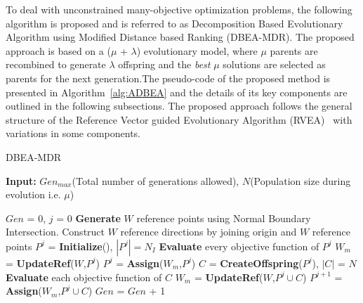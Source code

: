 \documentclass{sig-alternate}
\begin{document}
To deal with unconstrained many-objective optimization problems, the following algorithm is proposed and is referred to as Decomposition Based Evolutionary Algorithm using Modified Distance based Ranking (DBEA-MDR). The proposed approach is based on a ($\mu$ + $\lambda$) evolutionary model, where $\mu$ parents are recombined to generate $\lambda$ offspring and the \textit{best} $\mu$ solutions are selected as parents for the next generation.The pseudo-code of the proposed method is presented in Algorithm~\ref{alg:ADBEA} and the details of its key components are outlined in the following subsections. The proposed approach follows the general structure of the Reference Vector guided Evolutionary Algorithm (RVEA)~\cite{Cheng2016many} with variations in some components.

\begin{algorithm}[!ht]\footnotesize
   \caption{DBEA-MDR}
   \textbf{Input:} $Gen_{max}$\hspace{1mm}(Total number of generations allowed), $N$\hspace{1mm}(Population size during evolution i.e. $\mu$)
   \begin{algorithmic}[1]
   	\STATE $Gen$ = 0, $j$ = 0
   	\STATE \textbf{Generate} $W$ reference points using Normal Boundary Intersection.
   	\STATE Construct $W$ reference directions by joining origin and $W$ reference points
   	\STATE $P^j$ = \textbf{Initialize}(), $\left|P^j\right| = N_I$ 
   	\STATE \textbf{Evaluate} every objective function of $P^j$
   	\STATE $W_m$ = \textbf{UpdateRef}($W$,$P^j$)
   	\STATE $P^j$ = \textbf{Assign}($W_m$,$P^j$) 	
   	\STATE $C$ = \textbf{CreateOffspring}($P^j$), $\left|C\right|$ = $N$
   	\STATE \textbf{Evaluate} each objective function of $C$
   	\STATE $W_m$ = \textbf{UpdateRef}($W$,$P^j \cup C$)
   	\STATE $P^{j+1}$ = \textbf{Assign}($W_m$,$P^j \cup C$)   
   	\STATE $Gen$ = $Gen$ + 1
   	\ENDWHILE		
  
	\end{algorithmic}
   \label{alg:ADBEA}
\end{algorithm} 
\end{document}
